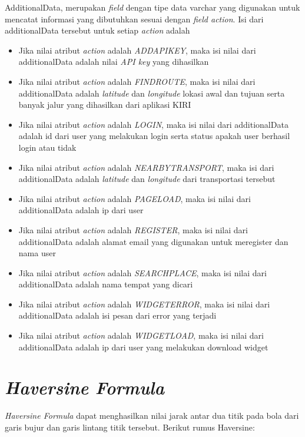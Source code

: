 AdditionalData, merupakan \textsl{field} dengan tipe data varchar yang digunakan untuk mencatat informasi yang dibutuhkan sesuai dengan \textsl{field action}. Isi dari additionalData tersebut untuk setiap \textsl{action} adalah
\begin{itemize}
	\item Jika nilai atribut \textsl{action} adalah \textsl{ADDAPIKEY}, maka isi nilai dari additionalData adalah nilai \textsl{API key} yang dihasilkan
	\item Jika nilai atribut \textsl{action} adalah \textsl{FINDROUTE}, maka isi nilai dari additionalData adalah \textsl{latitude} dan \textsl{longitude} lokasi awal dan tujuan serta banyak jalur yang dihasilkan dari aplikasi KIRI
	\item Jika nilai atribut \textsl{action} adalah \textsl{LOGIN}, maka isi nilai dari additionalData adalah id dari user yang melakukan login serta status apakah user berhasil login atau tidak
	\item Jika nilai atribut \textsl{action} adalah \textsl{NEARBYTRANSPORT}, maka isi dari additionalData adalah \textsl{latitude} dan \textsl{longitude} dari transportasi tersebut
	\item Jika nilai atribut \textsl{action} adalah \textsl{PAGELOAD}, maka isi nilai dari additionalData adalah ip dari user
	\item Jika nilai atribut \textsl{action} adalah \textsl{REGISTER}, maka isi nilai dari additionalData adalah alamat email yang digunakan untuk meregister dan nama user
	\item Jika nilai atribut \textsl{action} adalah \textsl{SEARCHPLACE}, maka isi nilai dari additionalData adalah nama tempat yang dicari
	\item Jika nilai atribut \textsl{action} adalah \textsl{WIDGETERROR}, maka isi nilai dari additionalData adalah isi pesan dari error yang terjadi
	\item Jika nilai atribut \textsl{action} adalah \textsl{WIDGETLOAD}, maka isi nilai dari additionalData adalah ip dari user yang melakukan download widget
\end{itemize}

\section{\textsl{Haversine Formula}}
\textsl{Haversine Formula} dapat menghasilkan nilai jarak antar dua titik pada bola dari garis bujur dan garis lintang titik tersebut. Berikut rumus Haversine:

